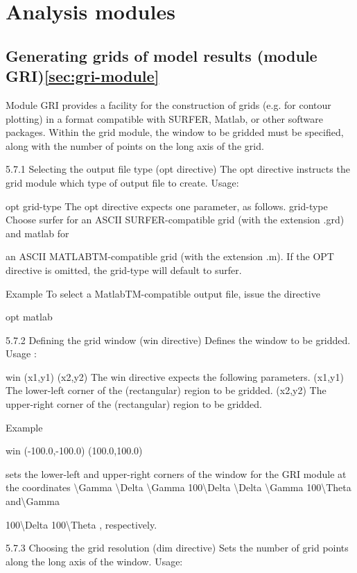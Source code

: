 \chapter{Analysis modules\label{cha:Analysis-modules}}

\section{Generating grids of model results (module GRI)\ref{sec:gri-module}}

Module GRI provides a facility for the construction of grids (e.g.
for contour plotting) in a format compatible with SURFER\texttrademark,
Matlab\texttrademark, or other software packages. Within the grid
module, the window to be gridded must be specified, along with the
number of points on the long axis of the grid. 

5.7.1 Selecting the output file type (opt directive) The opt directive
instructs the grid module which type of output file to create. Usage:

opt grid-type The opt directive expects one parameter, as follows.
grid-type Choose surfer for an ASCII SURFER\texttrademark-compatible grid (with
the extension .grd) and matlab for

an ASCII MATLABTM-compatible grid (with the extension .m). If the
OPT directive is omitted, the grid-type will default to surfer.

Example To select a MatlabTM-compatible output file, issue the directive

opt matlab

5.7.2 Defining the grid window (win directive) Defines the window
to be gridded. Usage :

win (x1,y1) (x2,y2) The win directive expects the following parameters.
(x1,y1) The lower-left corner of the (rectangular) region to be gridded.
(x2,y2) The upper-right corner of the (rectangular) region to be gridded.

Example

win (-100.0,-100.0) (100.0,100.0)

sets the lower-left and upper-right corners of the window for the
GRI module at the coordinates \textbackslash{}Gamma \textbackslash{}Delta
\textbackslash{}Gamma 100\textbackslash{}Delta \textbackslash{}Delta
\textbackslash{}Gamma 100\textbackslash{}Theta and\textbackslash{}Gamma 

100\textbackslash{}Delta 100\textbackslash{}Theta , respectively.

5.7.3 Choosing the grid resolution (dim directive) Sets the number
of grid points along the long axis of the window. Usage:

